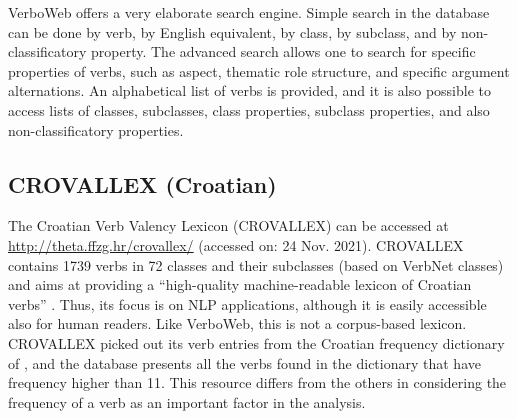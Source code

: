 \documentclass[english]{textolivre}
\begin{document}

VerboWeb offers a very elaborate search engine. Simple search in the database can be done by verb, by English equivalent, by class, by subclass, and by non-classificatory property. The advanced search allows one to search for specific properties of verbs, such as aspect, thematic role structure, and specific argument alternations. An alphabetical list of verbs is provided, and it is also possible to access lists of classes, subclasses, class properties, subclass properties, and also non-classificatory properties.

\subsection{CROVALLEX (Croatian)}

The Croatian Verb Valency Lexicon (CROVALLEX) \cite{preradovic_crovallex:_2009,preradovic_crovallex_2010} can be accessed at \url{http://theta.ffzg.hr/crovallex/} (accessed on: 24 Nov. 2021). CROVALLEX contains 1739 verbs in 72 classes and their subclasses (based on VerbNet classes) and aims at providing a “high-quality machine-readable lexicon of Croatian verbs” \cite[p.~533]{preradovic_crovallex:_2009}. Thus, its focus is on NLP applications, although it is easily accessible also for human readers. Like VerboWeb, this is not a corpus-based lexicon. CROVALLEX picked out its verb entries from the Croatian frequency dictionary of \textcite{mogus_hrvatski_1999}, and the database presents all the verbs found in the dictionary that have frequency higher than 11. This resource differs from the others in considering the frequency of a verb as an important factor in the analysis.
\end{document}
